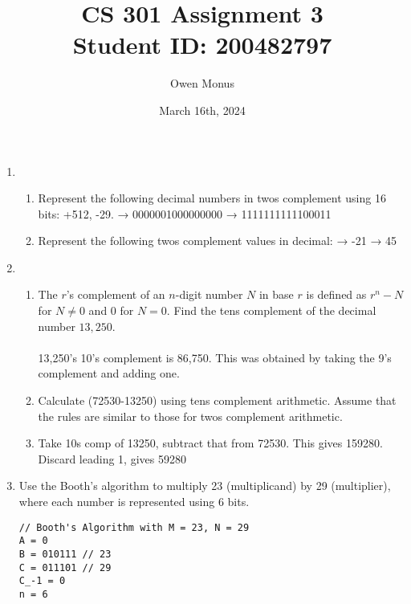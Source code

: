 \documentclass{article}
\begin{document}
\title{CS 301 Assignment 3\\[0.5cm]\large Student ID: 200482797}
\author{Owen Monus}
\date{March 16th, 2024}

\maketitle

\begin{enumerate}
    \item
    \begin{enumerate}
        \item Represent the following decimal numbers in twos complement using 16 bits: +512, -29.
         → 0000001000000000
         → 1111111111100011
        \item Represent the following twos complement values in decimal:
         → -21
         → 45
    \end{enumerate}
    
    \item
    \begin{enumerate}
        \item The $r$'s complement of an $n$-digit number $N$ in base $r$ is defined as $r^n - N$ for $N \neq 0$ and $0$ for $N = 0$. Find the tens complement of the decimal number $13,250$.
        \paragraph{} 13,250's 10's complement is 86,750. This was obtained by taking the 9's complement and adding one.
        
        \item Calculate (72530-13250) using tens complement arithmetic. Assume that the rules are
        similar to those for twos complement arithmetic.
        \item Take 10s comp of 13250, subtract that from 72530. This gives 159280. Discard leading 1, gives 59280
    \end{enumerate}

    \pagebreak
    \item Use the Booth's algorithm to multiply 23 (multiplicand) by 29 (multiplier), where each
    number is represented using 6 bits.
    \begin{verbatim}
// Booth's Algorithm with M = 23, N = 29
A = 0
B = 010111 // 23
C = 011101 // 29
C_-1 = 0
n = 6


\end{verbatim}
\end{enumerate}
\end{document}
